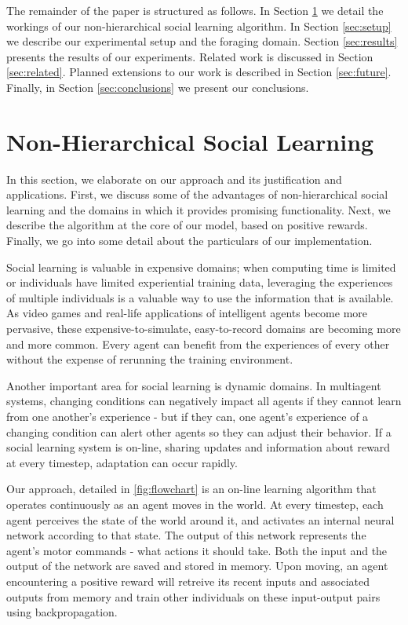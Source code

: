 \documentclass{acm_proc_article-sp}
\begin{document}
The remainder of the paper is structured as follows.
In Section \ref{sec:nhsl} we detail the workings of our non-hierarchical social learning algorithm.
In Section \ref{sec:setup} we describe our experimental setup and the foraging domain.
Section \ref{sec:results} presents the results of our experiments.
Related work is discussed in Section \ref{sec:related}. Planned extensions to our work is described in Section \ref{sec:future}. Finally, in Section \ref{sec:conclusions} we present our conclusions.

\section{Non-Hierarchical Social Learning}
\label{sec:nhsl}
In this section, we elaborate on our approach and its justification and applications. First, we discuss some of the advantages of non-hierarchical social learning and the domains in which it provides promising functionality.  Next, we describe the algorithm at the core of our model, based on positive rewards.  Finally, we go into some detail about the particulars of our implementation.

Social learning is valuable in expensive domains; when computing time is limited or individuals have limited experiential training data, leveraging the experiences of multiple individuals is a valuable way to use the information that is available. As video games and real-life applications of intelligent agents become more pervasive, these expensive-to-simulate, easy-to-record domains are becoming more and more common. Every agent can benefit from the experiences of every other without the expense of rerunning the training environment.  

Another important area for social learning is dynamic domains.  In multiagent systems, changing conditions can negatively impact all agents if they cannot learn from one another's experience - but if they can, one agent's experience of a changing condition can alert other agents so they can adjust their behavior. If a social learning system is on-line, sharing updates and information about reward at every timestep, adaptation can occur rapidly.

Our approach, detailed in \ref{fig:flowchart} is an on-line learning algorithm that operates continuously as an agent moves in the world.  At every timestep, each agent perceives the state of the world around it, and activates an internal neural network according to that state.  The output of this network represents the agent's motor commands - what actions it should take. Both the input and the output of the network are saved and stored in memory. Upon moving, an agent encountering a positive reward will retreive its recent inputs and associated outputs from memory and train other individuals on these input-output pairs using backpropagation.
\end{document}

